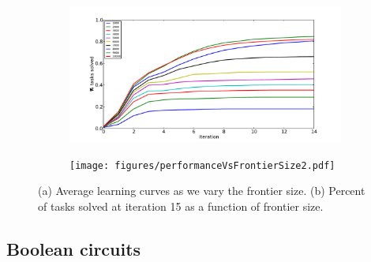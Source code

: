 \documentclass{article}
\begin{document}
\begin{figure}
\begin{subfigure}[Before]{0.45\linewidth}
\includegraphics[width=\linewidth]{figures/learningCurves2.pdf}
\end{subfigure}
\begin{subfigure}[After]{0.45\linewidth}
\texttt{[image: figures/performanceVsFrontierSize2.pdf]}
\end{subfigure}
\caption{(a) Average learning curves as we vary the frontier size. (b)
  Percent of tasks solved at iteration 15 as a function of frontier
  size.}
\label{fig:symreg} 
\end{figure}



\subsection{Boolean circuits}
\end{document}
